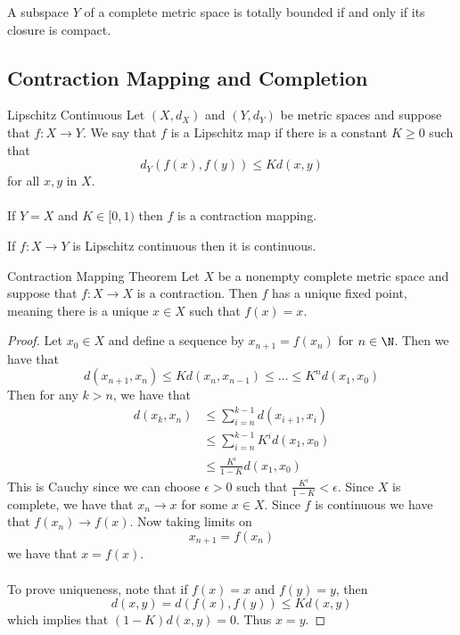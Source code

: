 \begin{thm}{}{} A subspace $Y$ of a complete metric space is totally bounded if and only if its closure is compact. 
\end{thm}

\subsection{Contraction Mapping and Completion}
\begin{defn}{Lipschitz Continuous}{} Let $(X,d_X)$ and $(Y,d_Y)$ be metric spaces and suppose that $f:X\to Y$. We say that $f$ is a Lipschitz map if there is a constant $K\geq 0$ such that $$d_Y(f(x),f(y))\leq Kd(x,y)$$ for all $x,y$ in $X$. \\~\\
If $Y=X$ and $K\in[0,1)$ then $f$ is a contraction mapping. 
\end{defn}

\begin{lmm}{}{} If $f:X\to Y$ is Lipschitz continuous then it is continuous. 
\end{lmm}

\begin{thm}{Contraction Mapping Theorem}{} Let $X$ be a nonempty complete metric space and suppose that $f:X\to X$ is a contraction. Then $f$ has a unique fixed point, meaning there is a unique $x\in X$ such that $f(x)=x$. \tcbline
\begin{proof}
Let $x_0\in X$ and define a sequence by $x_{n+1}=f(x_n)$ for $n\in\N$. Then we have that $$d(x_{n+1},x_n)\leq Kd(x_n,x_{n-1})\leq\dots\leq K^nd(x_1,x_0)$$ Then for any $k>n$, we have that 
\begin{align*}
d(x_k,x_n)&\leq\sum_{i=n}^{k-1}d(x_{i+1},x_i)\\
&\leq\sum_{i=n}^{k-1}K^id(x_1,x_0)\\
&\leq\frac{K^i}{1-K}d(x_1,x_0)
\end{align*}
This is Cauchy since we can choose $\epsilon>0$ such that $\frac{K^i}{1-K}<\epsilon$. Since $X$ is complete, we have that $x_n\to x$ for some $x\in X$. Since $f$ is continuous we have that $f(x_n)\to f(x)$. Now taking limits on $$x_{n+1}=f(x_n)$$ we have that $x=f(x)$. \\~\\
To prove uniqueness, note that if $f(x)=x$ and $f(y)=y$, then $$d(x,y)=d(f(x),f(y))\leq Kd(x,y)$$ which implies that $(1-K)d(x,y)=0$. Thus $x=y$. 
\end{proof}
\end{thm}

